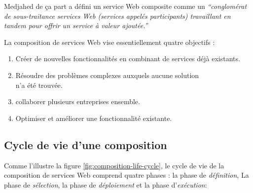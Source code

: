   Medjahed \cite{medjahed2004thesis}de ça part a défini un service Web
  composite comme un \emph{``conglomérat de sous-traitance services
    Web (services appelés participants) travaillant en tandem pour
    offrir un service à valeur ajoutée.''}\bigskip

  La composition de services Web vise essentiellement quatre objectifs
  \cite{driss2011approche}:

  \begin{enumerate}
  \item Créer de nouvelles fonctionnalités en combinant de services
    déjà existants.
  \item Résoudre des problèmes complexes auxquels aucune solution\\
    n'a été trouvée.
  \item collaborer plusieurs entreprises ensemble.
  \item Optimiser et améliorer une fonctionnalité existante.
  \end{enumerate}

  \subsection{Cycle de vie d'une composition }
  \label{sec:cycle-de-vie}
  Comme l'illustre la figure \ref{fig:composition-life-cycle}, le
  cycle de vie de la composition de services Web comprend quatre
  phases \cite{sheng2014web}: la phase de \textit{définition}, La
  phase de \textit{sélection}, la phase de \textit{déploiement} et la
  phase d'\textit{exécution}:

  

